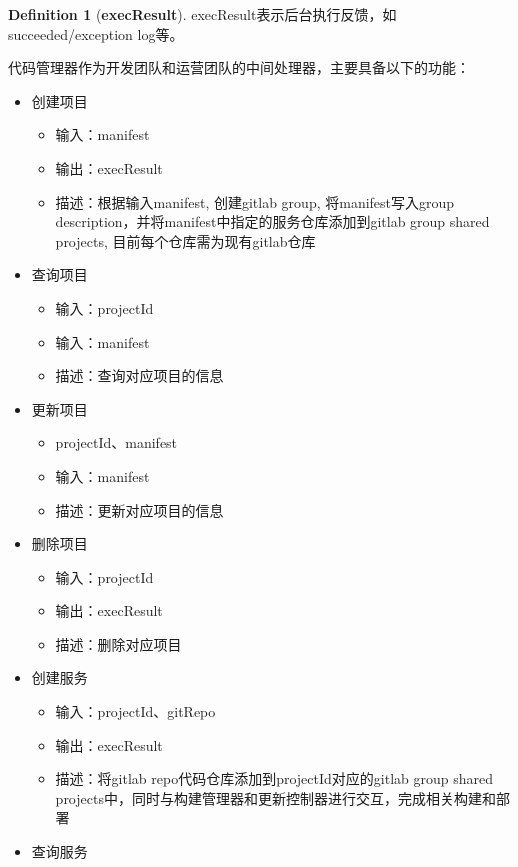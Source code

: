 \documentclass[a4paper, 12pt]{article}
\theoremstyle{definition}
\newtheorem{definition}{Definition}[section]
\begin{document}
\theoremstyle{definition}
\begin{definition}[\textbf{execResult}]
\label{definition:execResult}
execResult表示后台执行反馈，如succeeded/exception log等。
\end{definition}
代码管理器作为开发团队和运营团队的中间处理器，主要具备以下的功能：
\begin{itemize}
	\item{创建项目
		\begin{itemize}
		\item 输入：manifest
		\item 输出：execResult
		\item 描述：根据输入manifest, 创建gitlab group, 将manifest写入group description，并将manifest中指定的服务仓库添加到gitlab group shared projects, 目前每个仓库需为现有gitlab仓库
		\end{itemize}}
	\item{查询项目
		\begin{itemize}
		\item 输入：projectId
		\item 输入：manifest
		\item 描述：查询对应项目的信息
		\end{itemize}}
	\item{更新项目
		\begin{itemize}
		\item projectId、manifest
		\item 输入：manifest
		\item 描述：更新对应项目的信息
		\end{itemize}}
	\item{删除项目
		\begin{itemize}
		\item 输入：projectId
		\item 输出：execResult
		\item 描述：删除对应项目
		\end{itemize}}
	\item{创建服务
		\begin{itemize}
		\item 输入：projectId、gitRepo
		\item 输出：execResult
		\item 描述：将gitlab repo代码仓库添加到projectId对应的gitlab group shared projects中，同时与构建管理器和更新控制器进行交互，完成相关构建和部署
		\end{itemize}}
	\item{查询服务
		\begin{itemize}

\end{itemize}}
\end{itemize}
\end{document}

